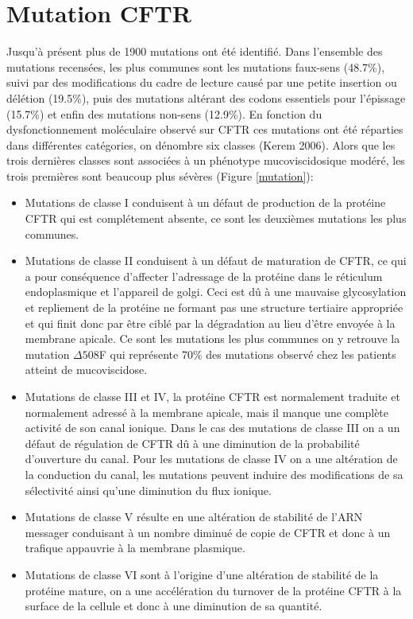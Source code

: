 		\section{Mutation CFTR}
Jusqu’à présent plus de 1900 mutations ont été identifié. Dans l’ensemble des mutations recensées, les plus communes sont les mutations faux-sens (48.7\%), suivi par des modifications du cadre de lecture causé par une petite insertion ou délétion (19.5\%), puis des mutations altérant des codons essentiels pour l’épissage (15.7\%) et enfin des mutations non-sens (12.9\%). En fonction du dysfonctionnement moléculaire observé sur CFTR ces mutations ont été réparties dans différentes catégories, on dénombre six classes (Kerem 2006)\cite{kerem_mutation_2006}. Alors que les trois dernières classes sont associées à un phénotype mucoviscidosique modéré, les trois premières sont beaucoup plus sévères (Figure \ref{mutation}):
\begin{itemize}
\item Mutations de classe I conduisent à un défaut de production de la protéine CFTR qui est complétement absente, ce sont les deuxièmes mutations les plus communes.
\item Mutations de classe II conduisent à un défaut de maturation de CFTR, ce qui a pour conséquence d’affecter l’adressage de la protéine dans le réticulum endoplasmique et l’appareil de golgi. Ceci est dû à une mauvaise glycosylation et repliement de la protéine ne formant pas une structure tertiaire appropriée et qui finit donc par être ciblé par la dégradation au lieu d’être envoyée à la membrane apicale. Ce sont les mutations les plus communes on y retrouve la mutation $\Delta508$F qui représente 70\% des mutations observé chez les patients atteint de mucoviscidose. 
\item Mutations de classe III et IV, la protéine CFTR est normalement traduite et normalement adressé à la membrane apicale, mais il manque une complète activité de son canal ionique. Dans le cas des mutations de classe III on a un défaut de régulation de CFTR dû à une diminution de la probabilité d’ouverture du canal. Pour les mutations de classe IV on a une altération de la conduction du canal, les mutations peuvent induire des modifications de sa sélectivité ainsi qu’une diminution du flux ionique. 
\item Mutations de classe V résulte en une altération de stabilité de l’ARN messager conduisant à un nombre diminué de copie de CFTR et donc à un trafique appauvrie à la membrane plasmique. 
\item Mutations de classe VI sont à l’origine d’une altération de stabilité de la protéine mature, on a une accélération du turnover de la protéine CFTR à la surface de la cellule et donc à une diminution de sa quantité.
\end{itemize}

